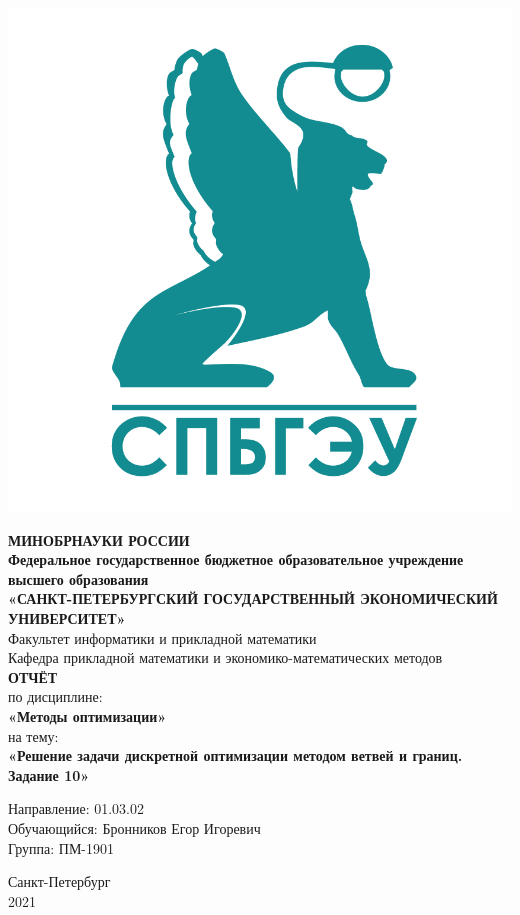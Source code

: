 \documentclass[14pt,a4paper,fleqn]{extarticle}
\begin{document}
	\begin{titlepage}
		\includegraphics[scale=0.12]{logo}
		\begin{center}
			\textbf{МИНОБРНАУКИ РОССИИ}\\
			\vspace{0.2cm}
			\textbf{Федеральное государственное бюджетное образовательное учреждение высшего образования}\\
			\textbf{«САНКТ-ПЕТЕРБУРГСКИЙ ГОСУДАРСТВЕННЫЙ ЭКОНОМИЧЕСКИЙ УНИВЕРСИТЕТ»}\\
			\vspace{0.6cm}
			Факультет информатики и прикладной математики\\
			Кафедра прикладной математики и экономико-математических методов\\
			\vspace{1cm}
			\textbf{ОТЧЁТ}\\
			по дисциплине:\\
			\textbf{«Методы оптимизации»}\\
			на тему:\\
			\textbf{«Решение задачи дискретной оптимизации методом ветвей и границ. Задание 10»}\\
		\end{center}
		\vspace{1cm}
		Направление: 01.03.02\\
		Обучающийся: Бронников Егор Игоревич\\
		Группа: ПМ-1901\\
		\vfill
		\begin{center}
			Санкт-Петербург\\
			2021\\
		\end{center}
	\end{titlepage}
\end{document}
